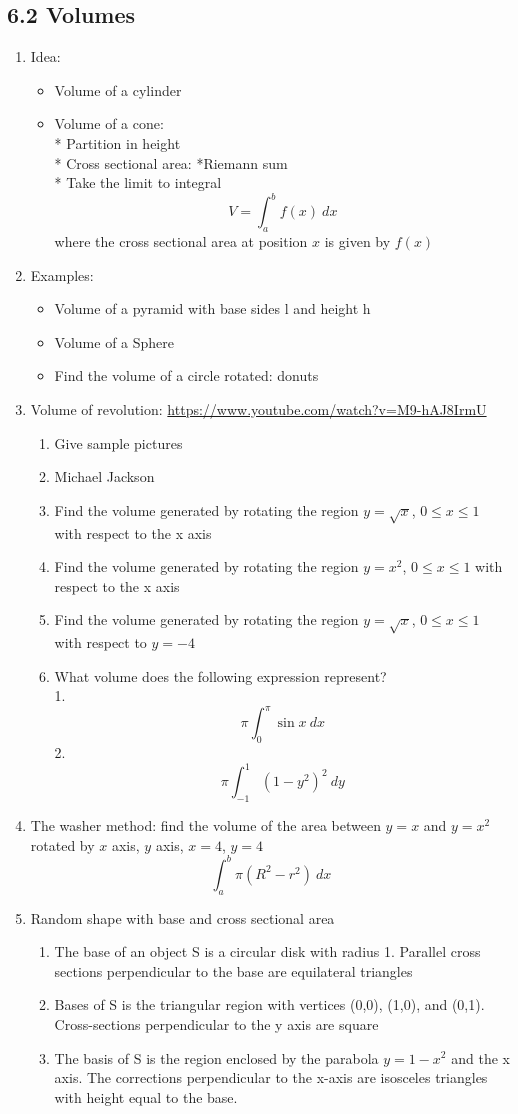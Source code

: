 \documentclass{article}
\begin{document}
\subsection{6.2 Volumes }
\begin{enumerate}
\item Idea: 
\begin{itemize}
\item Volume of a cylinder
\item Volume of a cone: \\
* Partition in height\\
* Cross sectional area: 
*Riemann sum\\
* Take the limit to integral
$$
V = \int_a^bf(x)~dx
$$
where the cross sectional area at position $x$ is given by $f(x)$
\end{itemize}
\item Examples: 
\begin{itemize}
\item Volume of a pyramid with base sides l and height h
\item Volume of a Sphere
\item Find the volume of a circle rotated: donuts
\end{itemize}
\item Volume of revolution: \url{https://www.youtube.com/watch?v=M9-hAJ8IrmU}
\begin{enumerate}
\item Give sample pictures
\item Michael Jackson
\item Find the volume generated by rotating the region $y =\sqrt{x}$, $0\leq x\leq 1$ with respect to the x axis
\item Find the volume generated by rotating the region $y =x^2$, $0\leq x\leq 1$ with respect to the x axis
\item Find the volume generated by rotating the region $y =\sqrt{x}$, $0\leq x\leq 1$ with respect to $y=-4$
\item What volume does the following expression represent?\\
1.
$$
\pi \int_0^\pi \sin x~dx
$$
2.
$$
\pi \int_{-1}^1 (1-y^2)^2~dy
$$
\end{enumerate}
\item The washer method: find the volume of the area between $y = x$ and $y = x^2$ rotated by $x$ axis, $y$ axis, $x= 4$, $y = 4$
$$
\int_a^b \pi(R^2-r^2)~dx
$$
\item Random shape with base and cross sectional area
\begin{enumerate}
\item The base of an object S is a circular disk with radius 1. Parallel cross sections perpendicular to the base are equilateral triangles
\item Bases of S is the triangular region with vertices (0,0), (1,0), and (0,1). Cross-sections perpendicular to the y axis are square
\item The basis of S is the region enclosed by the parabola $y = 1-x^2$ and the x axis. The corrections perpendicular to the x-axis are isosceles triangles with height equal to the base.
\end{enumerate}
\end{enumerate}
\end{document}
